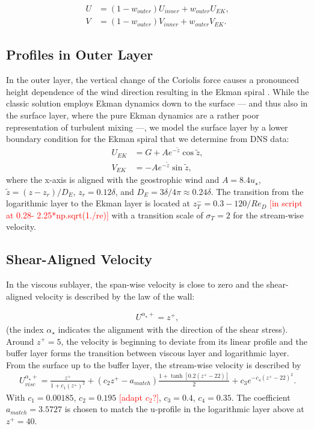 \documentclass[a4paper,11pt]{article}
\newcommand{\todo}[1]{\textcolor{red}{$[$#1$]$}}
\begin{document}
\begin{subequations}\label{blend}
  \begin{align}
    U &= (1-w_{outer})U_{inner} + w_{outer}U_{EK},\\
	  V &= (1-w_{outer})V_{inner} + w_{outer}V_{EK}.
	\end{align}
\end{subequations}

\subsection{Profiles in Outer Layer}

In the outer layer, the vertical change of the Coriolis force causes a  pronounced height dependence of the wind direction resulting in the Ekman spiral \cite{ekman1905influence}. While the classic solution employs Ekman dynamics down to the surface --- and thus also in the surface layer, where the pure Ekman dynamics are a rather poor representation of turbulent mixing ---, we model the surface layer by a lower boundary condition for the Ekman spiral that we determine from DNS data:
\begin{subequations}
  \begin{align}
    U_{EK} &= G + Ae^{-\tilde{z}}\cos\tilde{z},\\
		V_{EK} &= - Ae^{-\tilde{z}}\sin\tilde{z},
  \end{align}
\end{subequations}
where the x-axis is aligned with the geostrophic wind and $A = 8.4u_\star$, $\tilde{z} = (z-z_r)/D_E$, $z_r = 0.12\delta$, and $D_E = 3\delta/4\pi\approx 0.24\delta$. The transition from the logarithmic layer to the Ekman layer is located at $z^-_T=0.3-120/Re_D$ \todo{in script at 0.28- 2.25*np.sqrt(1./re)} with a transition scale of $\sigma_T=2$ for the stream-wise velocity.

\subsection{Shear-Aligned Velocity}

In the viscous sublayer, the span-wise velocity is close to zero and the shear-aligned velocity is described by the law of the wall:

\begin{align}
  U^{\alpha_\star+} = z^+,
\end{align}
(the index $\alpha_\star$ indicates the alignment with the direction of the shear stress). Around $z^+=5$, the velocity is beginning to deviate from its linear profile and the buffer layer forms the transition between viscous layer and logarithmic layer. From the surface up to the buffer layer, the stream-wise velocity is described by
\begin{align}
  U_{visc}^{\alpha_\star+} = \frac{z^+}{1+c_1(z^+)^2} + (c_2z^+-a_{match})\frac{1+\tanh[0.2(z^+-22)]}{2}+c_3e^{-c_4(z^+-22)^2}.
\end{align}
With $c_1 = 0.00185$, $c_2 = 0.195$ \todo{adapt $c_2$?}, $c_3 = 0.4$, $c_4 = 0.35$. The coefficient $a_{match}=3.5727$ is chosen to match the u-profile in the logarithmic layer above at $z^+=40$.
\end{document}
